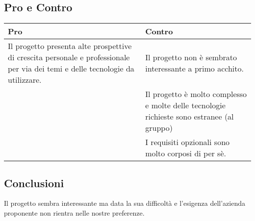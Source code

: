 \documentclass[a4paper,12pt]{article}
\begin{document}
{    \subsection*{Pro e Contro}{

        \begin{center} 
            \begin{tabular}{|p{8cm}|p{6cm}|}
                \hline
                \textbf{Pro} & \textbf{Contro} \\
                \hline
                Il progetto presenta alte prospettive di crescita personale e professionale per via dei temi e delle tecnologie da utilizzare. & Il progetto non è sembrato interessante a primo acchito.\\
                \hline
                & Il progetto è molto complesso e molte delle tecnologie richieste sono estranee (al gruppo) \\
                \hline
                & I requisiti opzionali sono molto corposi di per sè. \\
                \hline
            \end{tabular}
        \end{center}
    }

    \subsection*{Conclusioni}{
        Il progetto sembra interessante ma data la sua difficoltà e l'esigenza dell'azienda proponente non rientra nelle nostre preferenze.
    }
}

\newpage
\end{document}
